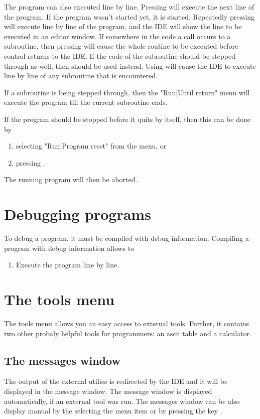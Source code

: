The program can also executed line by line. Pressing  will 
execute the next line of the program. If the program wasn't started
yet, it is started. Repeatedly pressing  will execute line 
by line of the program, and the IDE will show the line to be executed 
in an editor window. If somewhere in the code a call occurs to a subroutine,
then pressing  will cause the whole routine to be executed before
control returns to the IDE. If the code of the subroutine should be stepped
through as well, then  should be used instead. Using  will
cause the IDE to execute line by line of any subroutine that is encountered.

If a subroutine is being stepped through, then the "Run|Until return" menu
will execute the program till the current subroutine ends. 

If the program should be stopped before it quits by itself, then this can be
done by
\begin{enumerate}
\item selecting "Run|Program reset" from the menu, or
\item pressing .
\end{enumerate}
The running program will then be aborted.

\section{Debugging programs}
\label{se:debugging}
To debug a program, it must be compiled with debug information. Compiling a
program with debug information allows to
\begin{enumerate}
\item Execute the program line by line.
\end{enumerate}
\section{The tools menu}
\label{se:toolsmenu}
The tools menu allows you an easy access to external tools. Further,
it contains two other probaly helpful tools for programmers: an
ascii table and a calculator.

\subsection{The messages window}
\label{se:toolsmessages}
The output of the external utilies is redirected by the IDE and it
will be displayed in the message window. The message window is
displayed automatically, if an external tool was run. The
messages window can be also display manual by the selecting the
menu item  or by pressing the key .

